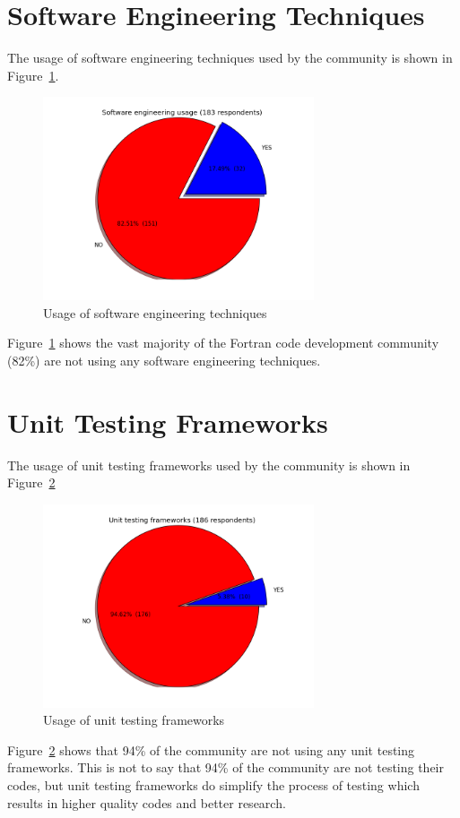 \documentclass[12pt]{article}
\begin{document}
\section{Software Engineering Techniques} \label{softeng}
The usage of software engineering techniques used by the community is shown 
in Figure~\ref{softeng:png}. 
\begin{figure}[H]
\begin{center}
\includegraphics[width=8cm,height=6cm]{softeng.png}
\caption{Usage of software engineering techniques}\label{softeng:png}
\end{center}
\end{figure}
Figure~\ref{softeng:png} shows the vast majority of the Fortran
code development community (82\%) are not using any software engineering techniques.
%
\section{Unit Testing Frameworks}\label{utf}
The usage of unit testing frameworks used by the community is shown in
Figure~\ref{pfunit:png}
\begin{figure}[H]
\begin{center}
\includegraphics[width=8cm,height=6cm]{pfunit.png}
\caption{Usage of unit testing frameworks}\label{pfunit:png}
\end{center}
\end{figure}
Figure~\ref{pfunit:png} shows that 94\% of the community are not using any
unit testing frameworks. This is not to say that 94\% of the community are not
testing their codes, but unit testing frameworks do simplify the process of
testing which results in higher quality codes and better research. 
%
\end{document}
